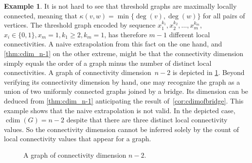 \documentclass[letterpaper,12pt,headings=normal,parskip=half]{scrartcl}
\DeclareMathOperator{\cdim}{cdim}
\theoremstyle{definition}
\newtheorem{example}[theorem]{Example}
\begin{document}
\begin{example}
    It is not hard to see that threshold graphs are maximally locally connected, meaning that $\kappa(v,w)=\min\{\deg(v),\deg(w)\}$ for all pairs of vertices.
    The threshold graph encoded by sequence $x_1^{k_1},x_2^{k_2},\ldots, x_m^{k_m}$, $x_i\in\{0,1\},x_m=1,k_1\geq 2, k_m=1$, has therefore $m-1$ different local connectivities. 
    A naive extrapolation from this fact on the one hand, and \cref{thm:cdim_n-1} on the other extreme, might be that the connectivity dimension simply equals the order of a graph minus the number of distinct local connectivities.
    A graph of connectivity dimension~$n-2$ is depicted in \cref{fig:cdimn-2}. 
Beyond verifying its connectivity dimension by hand, one may recognize the graph as a union of two uniformly connected graphs joined by a bridge. 
Its dimension can be deduced from \cref{thm:cdim_n-1} anticipating the result of~\cref{cor:cdimofbridge}.
This example shows that the naive extrapolation is not valid. 
In the depicted case, $\cdim(G)=n-2$ despite that there are three distinct local connectivity values. 
So the connectivity dimension cannot be inferred solely by the count of local connectivity values that appear for a graph.
\begin{figure}
\centering
{}
\caption{A graph of connectivity dimension $n-2$.}
\label{fig:cdimn-2}
\end{figure}
\end{example}
\end{document}
